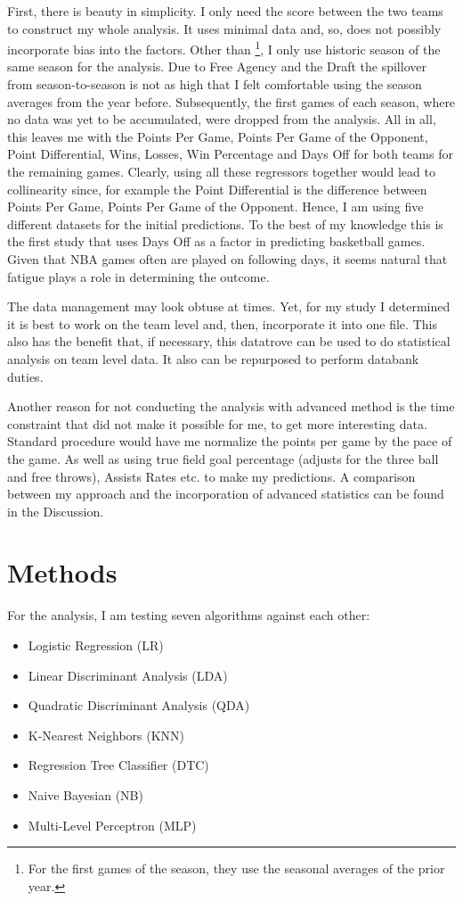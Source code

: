 \documentclass[11pt, a4paper, leqno]{article}
\begin{document}
First, there is beauty in simplicity. I only need the score between the two teams to construct my whole analysis. It uses minimal data and, so, does not possibly  incorporate bias into the factors.
Other than \citet{Zimbo}\footnote{For the first games of the season, they use the seasonal averages of the prior year.},  I only use historic season of the same season for the analysis. Due to Free Agency and the Draft the spillover from season-to-season is not as high that I felt comfortable using the season averages from the year before. Subsequently, the first games of each season, where no data was yet to be accumulated, were dropped from the analysis. All in all, this leaves me with the  Points Per Game, Points Per Game of the Opponent, Point Differential, Wins, Losses, Win Percentage and Days Off for both teams for the remaining games. Clearly, using all these regressors together would lead to collinearity since, for example the Point Differential is the difference between Points Per Game, Points Per Game of the Opponent. Hence, I am using five different datasets for the initial predictions. To the best of my knowledge this is the first study that uses Days Off as a factor in predicting basketball games. Given that NBA games often are played on following days, it seems natural that fatigue plays a role in determining the outcome.

The data management may look obtuse at times. Yet, for my study I determined it is best to work on the team level and, then, incorporate it into one file. This also has the benefit that, if necessary, this datatrove can be used to do statistical analysis on team level data. It also can be repurposed to perform databank duties.

Another reason for not conducting the analysis with advanced method is the time constraint that did not make it possible for me, to get more interesting data. Standard procedure would have me normalize the points per game by the pace of the game. As well as using true field goal percentage (adjusts for the three ball and free throws), Assists Rates etc. to make my predictions. A comparison between my approach and the incorporation of  advanced statistics can be found in the Discussion.

\section{Methods}

For the analysis, I am testing seven algorithms against each other: \\
\begin{itemize}
\setlength\itemsep{0.1em}
\item Logistic Regression (LR)
\item Linear Discriminant Analysis (LDA)
\item Quadratic Discriminant Analysis (QDA)
\item K-Nearest Neighbors (KNN)
\item Regression Tree Classifier (DTC)
\item Naive Bayesian (NB)
\item Multi-Level Perceptron (MLP)
\end{itemize}
\end{document}

